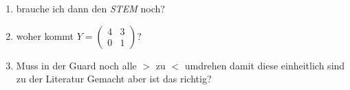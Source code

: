 \begin{enumerate}
	\item brauche ich dann den \emph{STEM} noch?
	\item woher kommt $Y=\begin{pmatrix}
		4 & 3 \\ 0 & 1 
	\end{pmatrix}$?
	\item Muss in der Guard noch alle $>$ zu $<$ umdrehen damit diese einheitlich sind zu der Literatur \answer Gemacht aber ist das richtig?
\end{enumerate}